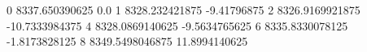 0 8337.650390625 0.0
1 8328.232421875 -9.41796875
2 8326.9169921875 -10.7333984375
4 8328.0869140625 -9.5634765625
6 8335.8330078125 -1.8173828125
8 8349.5498046875 11.8994140625

